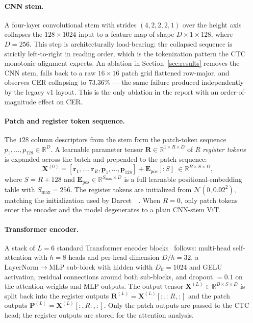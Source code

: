 \paragraph{CNN stem.} A four-layer convolutional stem with strides $(4, 2, 2, 2, 1)$ over the height axis collapses the $128 \times 1024$ input to a feature map of shape $D \times 1 \times 128$, where $D = 256$. This step is architecturally load-bearing: the collapsed sequence is strictly left-to-right in reading order, which is the tokenization pattern the CTC monotonic alignment expects. An ablation in Section~\ref{sec:results} removes the CNN stem, falls back to a raw $16 \times 16$ patch grid flattened row-major, and observes CER collapsing to $73.36\%$ --- the same failure produced independently by the legacy v1 layout. This is the only ablation in the report with an order-of-magnitude effect on CER.

\paragraph{Patch and register token sequence.} The $128$ column descriptors from the stem form the patch-token sequence $p_1, \ldots, p_{128} \in \mathbb{R}^{D}$. A learnable parameter tensor $\mathbf{R} \in \mathbb{R}^{1 \times R \times D}$ of $R$ \emph{register tokens} is expanded across the batch and prepended to the patch sequence:
\begin{equation}
\label{eq:token_sequence}
\mathbf{X}^{(0)} = [\mathbf{r}_1, \ldots, \mathbf{r}_R, \mathbf{p}_1, \ldots, \mathbf{p}_{128}] + \mathbf{E}_{\mathrm{pos}}[:S] \; \in \mathbb{R}^{B \times S \times D},
\end{equation}
where $S = R + 128$ and $\mathbf{E}_{\mathrm{pos}} \in \mathbb{R}^{S_{\max} \times D}$ is a full learnable positional-embedding table with $S_{\max} = 256$. The register tokens are initialized from $\mathcal{N}(0, 0.02^2)$, matching the initialization used by Darcet~\etal~\cite{darcet2024registers}. When $R = 0$, only patch tokens enter the encoder and the model degenerates to a plain CNN-stem ViT.

\paragraph{Transformer encoder.} A stack of $L = 6$ standard Transformer encoder blocks~\cite{vaswani2017attention} follows: multi-head self-attention with $h = 8$ heads and per-head dimension $D/h = 32$, a $\mathrm{LayerNorm} \rightarrow \mathrm{MLP}$ sub-block with hidden width $D_{\mathrm{ff}} = 1024$ and GELU activation, residual connections around both sub-blocks, and dropout $= 0.1$ on the attention weights and MLP outputs. The output tensor $\mathbf{X}^{(L)} \in \mathbb{R}^{B \times S \times D}$ is split back into the register outputs $\mathbf{R}^{(L)} = \mathbf{X}^{(L)}[:, :R, :]$ and the patch outputs $\mathbf{P}^{(L)} = \mathbf{X}^{(L)}[:, R:, :]$. Only the patch outputs are passed to the CTC head; the register outputs are stored for the attention analysis.


